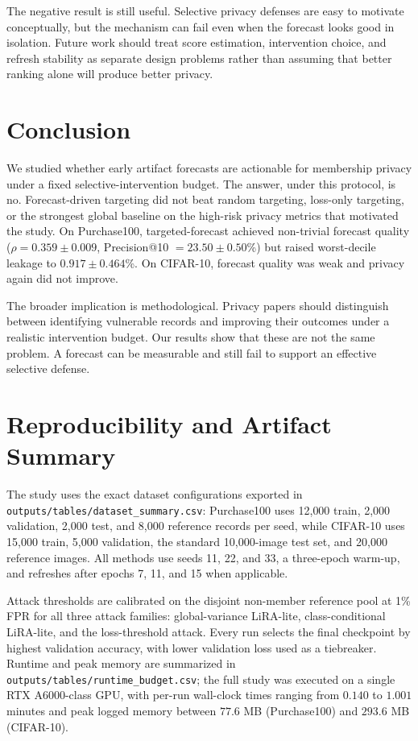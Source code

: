 \documentclass{article}
\newcommand{\lira}{LiRA-lite}
\newcommand{\purch}{Purchase100}
\newcommand{\cifar}{CIFAR-10}
\begin{document}
The negative result is still useful. Selective privacy defenses are easy to motivate conceptually, but the mechanism can fail even when the forecast looks good in isolation. Future work should treat score estimation, intervention choice, and refresh stability as separate design problems rather than assuming that better ranking alone will produce better privacy.

\section{Conclusion}
\label{sec:conclusion}

We studied whether early artifact forecasts are actionable for membership privacy under a fixed selective-intervention budget. The answer, under this protocol, is no. Forecast-driven targeting did not beat random targeting, loss-only targeting, or the strongest global baseline on the high-risk privacy metrics that motivated the study. On \purch{}, targeted-forecast achieved non-trivial forecast quality ($\rho=0.359\pm0.009$, Precision@10 $=23.50\pm0.50$\%) but raised worst-decile leakage to $0.917\pm0.464$\%. On \cifar{}, forecast quality was weak and privacy again did not improve.

The broader implication is methodological. Privacy papers should distinguish between identifying vulnerable records and improving their outcomes under a realistic intervention budget. Our results show that these are not the same problem. A forecast can be measurable and still fail to support an effective selective defense.

\appendix

\section{Reproducibility and Artifact Summary}
\label{sec:appendix}

The study uses the exact dataset configurations exported in \texttt{outputs/tables/dataset\_summary.csv}: \purch{} uses 12{,}000 train, 2{,}000 validation, 2{,}000 test, and 8{,}000 reference records per seed, while \cifar{} uses 15{,}000 train, 5{,}000 validation, the standard 10{,}000-image test set, and 20{,}000 reference images. All methods use seeds 11, 22, and 33, a three-epoch warm-up, and refreshes after epochs 7, 11, and 15 when applicable.

Attack thresholds are calibrated on the disjoint non-member reference pool at 1\% FPR for all three attack families: global-variance \lira{}, class-conditional \lira{}, and the loss-threshold attack. Every run selects the final checkpoint by highest validation accuracy, with lower validation loss used as a tiebreaker. Runtime and peak memory are summarized in \texttt{outputs/tables/runtime\_budget.csv}; the full study was executed on a single RTX A6000-class GPU, with per-run wall-clock times ranging from $0.140$ to $1.001$ minutes and peak logged memory between $77.6$ MB (\purch{}) and $293.6$ MB (\cifar{}).
\end{document}
